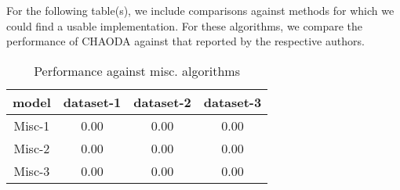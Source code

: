 For the following table(s), we include comparisons against methods for which we could find a usable implementation.
For these algorithms, we compare the performance of CHAODA against that reported by the respective authors.



\begin{table}[!b]
\renewcommand{\arraystretch}{1.25}
\caption{Performance against misc. algorithms}
\label{table:results:misc-comparisons}
\vskip 0.15in
\begin{center}
\begin{small}
\begin{sc}
\begin{tabular}{|c|c|c|c|}
\hline
\textbf{model} & \textbf{dataset-1} & \textbf{dataset-2} & \textbf{dataset-3} \\
\hline
Misc-1 & 0.00 & 0.00 & 0.00 \\
\hline
Misc-2 & 0.00 & 0.00 & 0.00 \\
\hline
Misc-3 & 0.00 & 0.00 & 0.00 \\
\hline
\end{tabular}
\end{sc}
\end{small}
\end{center}
\vskip -0.1in
\end{table}




